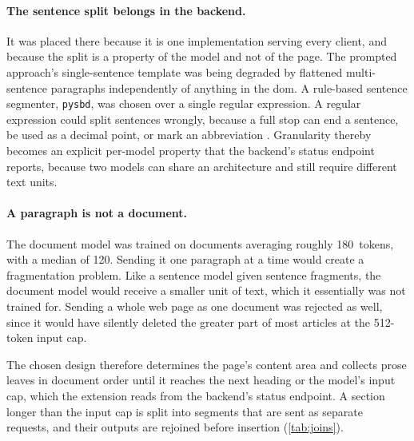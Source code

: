 \paragraph{The sentence split belongs in the backend.}
It was placed there because it is one implementation serving every client, and because the split is a property of the model and not of the page.
The prompted approach's single-sentence template was being degraded by flattened multi-sentence paragraphs independently of anything in the \gls{dom}.
A rule-based sentence segmenter, \texttt{pysbd}, was chosen over a single regular expression.
A regular expression could split sentences wrongly, because a full stop can end a sentence, be used as a decimal point, or mark an abbreviation \parencite[59--60]{jm3}.
Granularity thereby becomes an explicit per-model property that the backend's status endpoint reports, because two models can share an architecture and still require different text units.

\paragraph{A paragraph is not a document.}
The document model was trained on documents averaging roughly \num{180}~tokens, with a median of \num{120}.
Sending it one paragraph at a time would create a fragmentation problem.
Like a sentence model given sentence fragments, the document model would receive a smaller unit of text, which it essentially was not trained for.
Sending a whole web page as one document was rejected as well, since it would have silently deleted the greater part of most articles at the \num{512}-token input cap.

The chosen design therefore determines the page's content area and collects prose leaves in document order until it reaches the next heading or the model's input cap, which the extension reads from the backend's status endpoint.
A section longer than the input cap is split into segments that are sent as separate requests, and their outputs are rejoined before insertion (\cref{tab:joins}).

